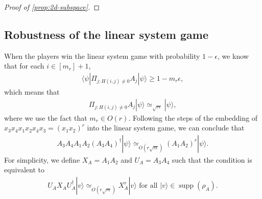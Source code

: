 \documentclass[11pt,letterpaper]{article}
\newcommand{\ket}[1]{|#1\rangle}
\newcommand{\bra}[1]{\langle#1|}
\DeclareMathOperator{\supp}{supp}
\newcommand{\1}{\mathbb{1}}
\newcommand{\tB}{\tilde{B}}
\newcommand{\appd}[1]{\simeq_{#1}}
\theoremstyle{definition}
\begin{document}
\begin{proof}[Proof of \cref{prop:2d-subspace}]
\end{proof}
\subsection{Robustness of the linear system game}
When the players win the linear system game with probability $1-\epsilon$,
we know that for each $i \in [m_r]+1$,
\begin{align}
\bra{\psi} \Pi_{j:H(i,j) \neq 0} A_j \ket{\psi} \geq 1- m_r \epsilon,
\end{align}
which means that 
\begin{align}
	\Pi_{j:H(i,j) \neq 0} A_j \ket{\psi} \appd{\sqrt{r\epsilon}} \ket{\psi},
\end{align}
where we use the fact that $m_r \in O(r)$.
Following the steps of the embedding of $x_3x_4x_1x_2x_4x_3 = (x_1x_2)^r$ into the linear system game,
we can conclude that 
\begin{align}
	A_3A_4 A_1A_2 (A_3A_4)^\dagger \ket{\psi}\appd{O(r\sqrt{r\epsilon})} (A_1A_2)^r \ket{\psi}.
\end{align}
For simplicity, we define $X_A = A_1A_2$ and $U_A=A_3A_4$ such that
the condition is equivalent to
\begin{align}
	\label{eq:ux_relation}
	U_AX_AU_A^\dagger \ket{v} \appd{O(r\sqrt{r\epsilon})} X_A^r \ket{v} \text{ for all } \ket{v} \in \supp(\rho_A).
\end{align}
\end{document}
